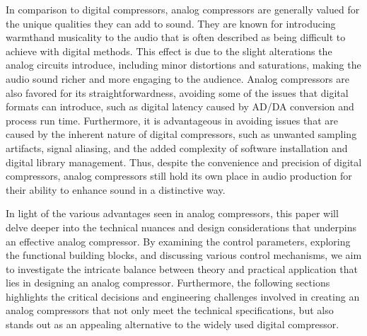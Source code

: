 \documentclass[10pt]{article}
\begin{document}
\begin{multicols*}{2}
            In comparison to digital compressors, analog compressors are generally valued for the unique qualities they can add to sound. They are known for introducing warmth\footnotemark and musicality to the audio that is often described as being difficult to achieve with digital methods. \cite{citations needed} This effect is due to the slight alterations the analog circuits introduce, including minor distortions and saturations, making the audio sound richer and more engaging to the audience. Analog compressors are also favored for its straightforwardness, avoiding some of the issues that digital formats can introduce, such as digital latency caused by AD/DA conversion and process run time. Furthermore, it is advantageous in avoiding issues that are caused by the inherent nature of digital compressors, such as unwanted sampling artifacts, signal aliasing, and the added complexity of software installation and digital library management. Thus, despite the convenience and precision of digital compressors, analog compressors still hold its own place in audio production for their ability to enhance sound in a distinctive way.\par
            In light of the various advantages seen in analog compressors, this paper will delve deeper into the technical nuances and design considerations that underpins an effective analog compressor. By examining the control parameters, exploring the functional building blocks, and discussing various control mechanisms, we aim to investigate the intricate balance between theory and practical application that lies in designing an analog compressor. Furthermore, the following sections highlights the critical decisions and engineering challenges involved in creating an analog compressors that not only meet the technical specifications, but also stands out as an appealing alternative to the widely used digital compressor.

            \vspace{2cm}

            \noindent
            \begin{minipage}[b]{\linewidth}
                \noindent
            \end{minipage}\hfill



\end{multicols*}
\end{document}
